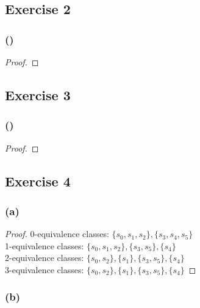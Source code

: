 \documentclass[14pt]{extarticle}
\begin{document}
\subsection{Exercise 2}

\subsubsection{()}

\begin{proof}

\end{proof}

\subsection{Exercise 3}

\subsubsection{()}

\begin{proof}

\end{proof}

\subsection{Exercise 4}

\subsubsection{(a)}

\begin{proof}
0-equivalence classes: \(\{s_0, s_1, s_2\}, \{s_3, s_4, s_5\}\) \\
1-equivalence classes: \(\{s_0, s_1, s_2\}, \{s_3, s_5\}, \{s_4\}\) \\
2-equivalence classes: \(\{s_0, s_2\}, \{s_1\}, \{s_3, s_5\}, \{s_4\}\) \\
3-equivalence classes: \(\{s_0, s_2\}, \{s_1\}, \{s_3, s_5\}, \{s_4\}\)
\end{proof}

\subsubsection{(b)}
\end{document}
